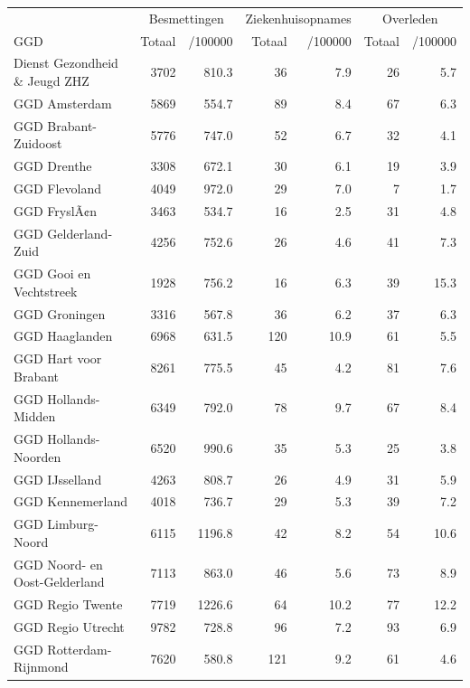 \documentclass[
  english,
  man,floatsintext]{apa6}
\begin{document}
\begin{table}[H]
\centering\begingroup\fontsize{10}{12}\selectfont

\begin{threeparttable}
\begin{tabular}{lrrrrrr}
\toprule
\multicolumn{1}{c}{ } & \multicolumn{2}{c}{Besmettingen} & \multicolumn{2}{c}{Ziekenhuisopnames} & \multicolumn{2}{c}{Overleden} \\
\cmidrule(l{3pt}r{3pt}){2-3} \cmidrule(l{3pt}r{3pt}){4-5} \cmidrule(l{3pt}r{3pt}){6-7}
GGD & Totaal & /100000 & Totaal & /100000 & Totaal & /100000\\
\midrule
Dienst Gezondheid \& Jeugd ZHZ & 3702 & 810.3 & 36 & 7.9 & 26 & 5.7\\
GGD Amsterdam & 5869 & 554.7 & 89 & 8.4 & 67 & 6.3\\
GGD Brabant-Zuidoost & 5776 & 747.0 & 52 & 6.7 & 32 & 4.1\\
GGD Drenthe & 3308 & 672.1 & 30 & 6.1 & 19 & 3.9\\
GGD Flevoland & 4049 & 972.0 & 29 & 7.0 & 7 & 1.7\\
GGD FryslÃ¢n & 3463 & 534.7 & 16 & 2.5 & 31 & 4.8\\
GGD Gelderland-Zuid & 4256 & 752.6 & 26 & 4.6 & 41 & 7.3\\
GGD Gooi en Vechtstreek & 1928 & 756.2 & 16 & 6.3 & 39 & 15.3\\
GGD Groningen & 3316 & 567.8 & 36 & 6.2 & 37 & 6.3\\
GGD Haaglanden & 6968 & 631.5 & 120 & 10.9 & 61 & 5.5\\
GGD Hart voor Brabant & 8261 & 775.5 & 45 & 4.2 & 81 & 7.6\\
GGD Hollands-Midden & 6349 & 792.0 & 78 & 9.7 & 67 & 8.4\\
GGD Hollands-Noorden & 6520 & 990.6 & 35 & 5.3 & 25 & 3.8\\
GGD IJsselland & 4263 & 808.7 & 26 & 4.9 & 31 & 5.9\\
GGD Kennemerland & 4018 & 736.7 & 29 & 5.3 & 39 & 7.2\\
GGD Limburg-Noord & 6115 & 1196.8 & 42 & 8.2 & 54 & 10.6\\
GGD Noord- en Oost-Gelderland & 7113 & 863.0 & 46 & 5.6 & 73 & 8.9\\
GGD Regio Twente & 7719 & 1226.6 & 64 & 10.2 & 77 & 12.2\\
GGD Regio Utrecht & 9782 & 728.8 & 96 & 7.2 & 93 & 6.9\\
GGD Rotterdam-Rijnmond & 7620 & 580.8 & 121 & 9.2 & 61 & 4.6\\

\end{tabular}
\end{threeparttable}
\end{table}
\end{document}

